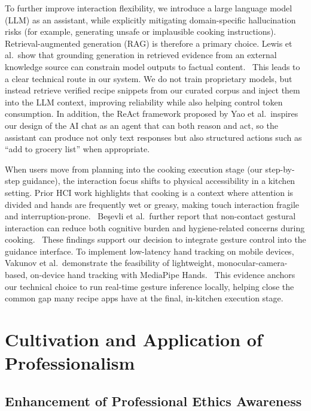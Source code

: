 \documentclass[sigconf]{acmart}
\begin{document}
To further improve interaction flexibility, we introduce a large language model (LLM) as an assistant, while explicitly mitigating domain-specific hallucination risks (for example, generating unsafe or implausible cooking instructions). Retrieval-augmented generation (RAG) is therefore a primary choice. Lewis et al.\ show that grounding generation in retrieved evidence from an external knowledge source can constrain model outputs to factual content.\ \cite{lewis2020rag} This leads to a clear technical route in our system. We do not train proprietary models, but instead retrieve verified recipe snippets from our curated corpus and inject them into the LLM context, improving reliability while also helping control token consumption. In addition, the ReAct framework proposed by Yao et al.\ inspires our design of the AI chat as an agent that can both reason and act, so the assistant can produce not only text responses but also structured actions such as ``add to grocery list'' when appropriate.\ \cite{yao2023react}

When users move from planning into the cooking execution stage (our step-by-step guidance), the interaction focus shifts to physical accessibility in a kitchen setting. Prior HCI work highlights that cooking is a context where attention is divided and hands are frequently wet or greasy, making touch interaction fragile and interruption-prone.\ \cite{nansen2014kitchen_kinesics} Be{\c{s}}evli et al.\ further report that non-contact gestural interaction can reduce both cognitive burden and hygiene-related concerns during cooking.\ \cite{besevli2022gestural_kitchen} These findings support our decision to integrate gesture control into the guidance interface. To implement low-latency hand tracking on mobile devices, Vakunov et al.\ demonstrate the feasibility of lightweight, monocular-camera-based, on-device hand tracking with MediaPipe Hands.\ \cite{vakunov2020mediapipe_hands} This evidence anchors our technical choice to run real-time gesture inference locally, helping close the common gap many recipe apps have at the final, in-kitchen execution stage.


\section{Cultivation and Application of Professionalism}

\subsection{Enhancement of Professional Ethics Awareness}
\end{document}
